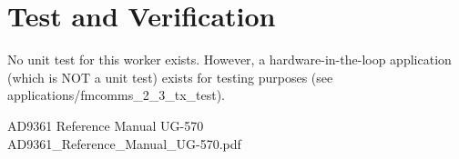 \section*{Test and Verification}
No unit test for this worker exists. However, a hardware-in-the-loop application (which is NOT a unit test) exists for testing purposes (see applications/fmcomms\_2\_3\_tx\_test).

 \begin{thebibliography}{1}


  AD9361 Reference Manual UG-570\\
 AD9361\_Reference\_Manual\_UG-570.pdf
 \end{thebibliography}

